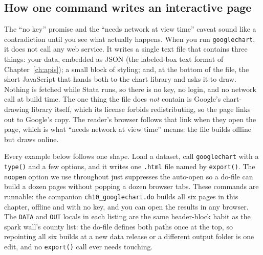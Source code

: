 \documentclass[
    a4paper,
    fontsize=10pt,
    twoside=true,
    numbers=noenddot,
]{kaobook}
\begin{document}
\subsection{How one command writes an interactive page}\label{sec:gc-how}
The \enquote{no key} promise and the \enquote{needs network at view time} caveat sound like a contradiction until you see what actually happens. When you run \texttt{googlechart}, it does not call any web service. It writes a single text file that contains three things: your data, embedded as JSON (the labeled-box text format of Chapter~\ref{ch:apis}); a small block of styling; and, at the bottom of the file, the short JavaScript that hands both to the chart library and asks it to draw. Nothing is fetched while Stata runs, so there is no key, no login, and no network call at build time. The one thing the file does \emph{not} contain is Google's chart-drawing library itself, which its license forbids redistributing, so the page links out to Google's copy. The reader's browser follows that link when they open the page, which is what \enquote{needs network at view time} means: the file builds offline but draws online.

Every example below follows one shape. Load a dataset, call \texttt{googlechart} with a \texttt{type()} and a few options, and it writes one \texttt{.html} file named by \texttt{export()}. The \texttt{noopen} option we use throughout just suppresses the auto-open so a do-file can build a dozen pages without popping a dozen browser tabs. These commands are runnable: the companion \texttt{ch10\_googlechart.do} builds all six pages in this chapter, offline and with no key, and you can open the results in any browser. The \texttt{DATA} and \texttt{OUT} locals in each listing are the same header-block habit as the spark wall's county list: the do-file defines both paths once at the top, so repointing all six builds at a new data release or a different output folder is one edit, and no \texttt{export()} call ever needs touching.
\end{document}
